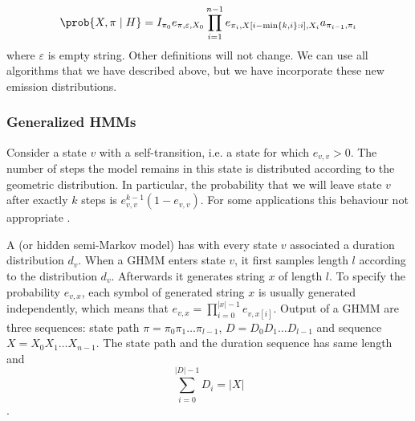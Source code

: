 \[
\prob{X,\pi\mid H} = 
I_{\pi_0}e_{\pi,\varepsilon,X_0}\prod_{i=1}^{n-1}
e_{\pi_i,X[i-\min\{k,i\}:i],X_i}a_{\pi_{i-1},\pi_i}
\]
where $\varepsilon$ is empty string. Other definitions will not change. We can
use all algorithms that we have described above, but we have incorporate these
new emission distributions.

\subsubsection{Generalized HMMs}

Consider a state $v$ with a self-transition, i.e. a state for which $e_{v,v}>0$.
The number of steps the model remains in this state is distributed according to
the geometric distribution.
In particular, the probability that we will leave state $v$ after exactly $k$ steps is
$e_{v,v}^{k-1}(1-e_{v,v})$. For some
applications this behaviour not
appropriate \cite{Burge1997,Majoros2004}.

A  (or hidden semi-Markov model)
has with every state $v$ associated a duration distribution $d_v$.  When
a GHMM enters state $v$, it first samples length $l$ according
to the distribution $d_v$.  Afterwards it generates string $x$ of length $l$.  To
specify the probability $e_{v,x}$, each symbol of generated string $x$ is usually
generated independently, which means that $e_{v,x}=\prod_{i=0}^{|x|-1}e_{v,x[i]}$.
Output of a GHMM are three sequences: state path $\pi=\pi_0\pi_1\dots\pi_{l-1}$,
 $D=D_0D_1\dots D_{l-1}$ and sequence
$X=X_0X_1\dots X_{n-1}$.  The state path and the duration sequence has same
length and \[\sum_{i=0}^{|D|-1}D_i = |X|\].

